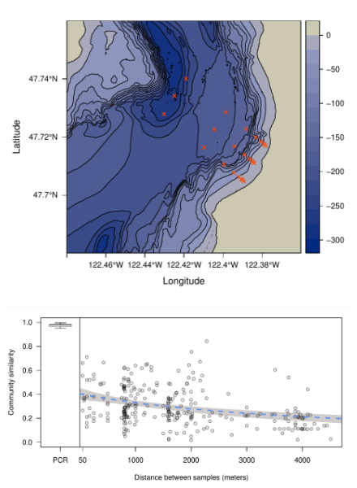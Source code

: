 \documentclass[11pt,letterpaper]{article} %
\begin{document}
\begin{figure}[H] %
  \centering
    \includegraphics[width=1\textwidth]{site_map.pdf}
    \caption{\protect}
  \label{site_map}
\end{figure}


\begin{figure}[H] %
  \centering
    \includegraphics[width=1\textwidth]{distance_decay.pdf}
    \caption{\protect}
  \label{distance_decay}
\end{figure}
\end{document}
